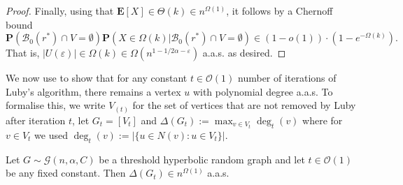 \documentclass[letterpaper,11pt]{article}
\newcommand{\E}[1]{\mathbf{E}\left[#1\right]}
\newcommand{\Prob}[1]{\mathbf{P}\left(#1\right)}
\newcommand{\eps}{\varepsilon}
\newcommand{\aas}{a.a.s.\xspace}
\newcommand{\B}{\mathcal B}
\newcommand{\1}{\mathbb I}
\newcommand{\hrg}{\mathcal{G}(n, \alpha, C)}
\newcommand{\bigO}{\mathcal{O}}
\begin{document}
\begin{proof}
\smallskip

Finally, using that $\E{X} \in \Theta(k) \in n^{\Omega(1)}$, it follows by a Chernoff bound
%
$$
\Prob{\B_0(r^*) \cap V = \emptyset} \Prob{X \in \Omega(k) | \B_0(r^*) \cap V = \emptyset} \in (1-o(1)) \cdot (1-e^{-\Omega(k)}).
$$
%
That is, $|U(\eps)| \in \Omega(k) \in \Omega\left(n^{1 - 1/2\alpha -\eps}\right)$ \aas as desired.
\end{proof}
%
We now use  to show that for any constant $t \in \bigO(1)$ number of iterations of Luby's algorithm, there remains a vertex $u$ with polynomial degree \aas To formalise this, we write $V_{(t)}$ for the set of vertices that are not removed by Luby after iteration $t$, let $G_t = [V_t]$ and $\Delta(G_t) := \max_{v \in V_t}\deg_t(v)$ where for $v \in V_t$ we used $\deg_t(v):= |\{u \in N(v) : u \in V_t\}|$.
%
\begin{proposition}\label{luby-aint-shatter-my-hrg}  Let $G \sim \hrg$ be a threshold hyperbolic random graph and let $t \in \bigO(1)$ be any fixed constant. Then $\Delta(G_t) \in n^{\Omega(1)}$ \aas   
\end{proposition}
%
\end{document}
